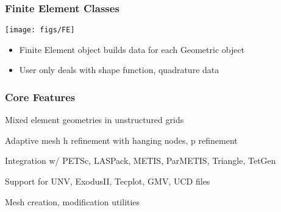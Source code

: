 \begin{frame}
\frametitle{Finite Element Classes}

\begin{minipage}[h]{.45\textwidth}
\begin{center}
\texttt{[image: figs/FE]}
\end{center}
\end{minipage}
\begin{minipage}[h]{.45\textwidth}
\begin{block}{}
\begin{itemize}
\item Finite Element object builds data for each Geometric object
\item User only deals with shape function, quadrature data
\end{itemize}
\end{block}
\end{minipage}

\end{frame}

\begin{frame}
\frametitle{Core Features}

\royitemizebegin{}
\item Mixed element geometries in unstructured grids
\item Adaptive mesh h refinement with hanging nodes, p refinement
\item Integration w/ PETSc, LASPack, METIS, ParMETIS, Triangle, TetGen
\item Support for UNV, ExodusII, Tecplot, GMV, UCD files
\item Mesh creation, modification utilities
\royitemizeend


\end{frame}

